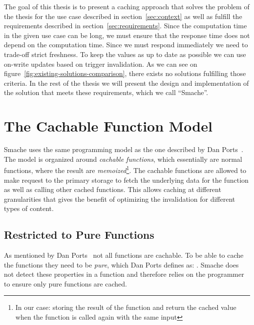 The goal of this thesis is to present a caching approach that solves the problem of the thesis for the use case described in section~\ref{sec:context} as well as fulfill the requirements described in section~\ref{sec:requirements}. Since the computation time in the given use case can be long, we must ensure that the response time does not depend on the computation time. Since we must respond immediately we need to trade-off strict freshness. To keep the values as up to date as possible we can use on-write updates based on trigger invalidation. As we can see on figure~\ref{fig:existing-solutions-comparison}, there exists no solutions fulfilling those criteria. In the rest of the thesis we will present the design and implementation of the solution that meets these requirements, which we call ``Smache''.


\section{The Cachable Function Model}
\label{sec:the_cachable_function_model}

Smache uses the same programming model as the one described by Dan Ports~\cite{paper:liskov}. The model is organized around \emph{cachable functions}, which essentially are normal functions, where the result are \emph{memoized}\footnote{In our case: storing the result of the function and return the cached value when the function is called again with the same input}. The cachable functions are allowed to make request to the primary storage to fetch the underlying data for the function as well as calling other cached functions. This allows caching at different granularities that gives the benefit of optimizing the invalidation for different types of content.


\subsection{Restricted to Pure Functions}
\label{subsec:restricted_to_pure_functions}

As mentioned by Dan Ports~\cite{paper:liskov} not all functions are cachable. To be able to cache the functions they need to be \emph{pure}, which Dan Ports defines as: . Smache does not detect these properties in a function and therefore relies on the programmer to ensure only pure functions are cached.

